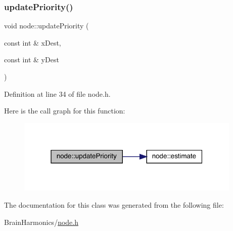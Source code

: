 \subsubsection{\texorpdfstring{update\+Priority()}{updatePriority()}}
{\footnotesize\ttfamily void node\+::update\+Priority (\begin{DoxyParamCaption}\item[{const int \&}]{x\+Dest,  }\item[{const int \&}]{y\+Dest }\end{DoxyParamCaption})\hspace{0.3cm}{\ttfamily [inline]}}



Definition at line 34 of file node.\+h.

Here is the call graph for this function\+:\nopagebreak
\begin{figure}[H]
\begin{center}
\leavevmode
\includegraphics[width=304pt]{classnode_ad51b92de008bd5107a7b55cc61fc497b_cgraph}
\end{center}
\end{figure}


The documentation for this class was generated from the following file\+:\begin{DoxyCompactItemize}
\item 
Brain\+Harmonics/\hyperlink{node_8h}{node.\+h}\end{DoxyCompactItemize}
